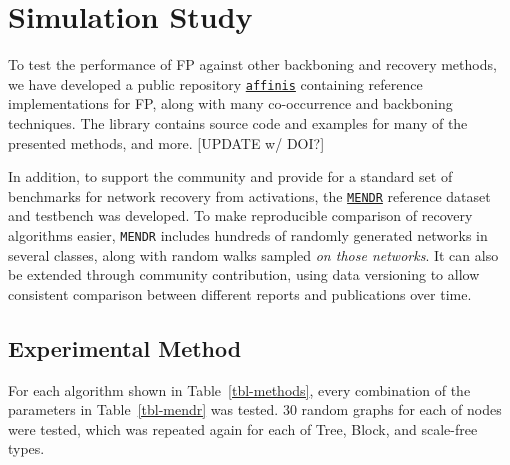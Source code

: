 \documentclass[%
	12pt,
		oneside,
		letterpaper
]{book}
\begin{document}
\section{Simulation Study}\label{sec-FP-experiments}

To test the performance of FP against other backboning and recovery
methods, we have developed a public repository
\href{https://github.com/rtbs-dev/affinis}{\texttt{affinis}} containing
reference implementations for FP, along with many co-occurrence and
backboning techniques. The library contains source code and examples for
many of the presented methods, and more. {[}UPDATE w/ DOI?{]}

In addition, to support the community and provide for a standard set of
benchmarks for network recovery from activations, the
\href{https://github.com/rtbs-dev/mendr}{\texttt{MENDR}} reference
dataset and testbench was developed. To make reproducible comparison of
recovery algorithms easier, \texttt{MENDR} includes hundreds of randomly
generated networks in several classes, along with random walks sampled
\emph{on those networks}. It can also be extended through community
contribution, using data versioning to allow consistent comparison
between different reports and publications over time.

\subsection{Experimental Method}\label{experimental-method}

For each algorithm shown in Table~\ref{tbl-methods}, every combination
of the parameters in Table~\ref{tbl-mendr} was tested. 30 random graphs
for each of nodes were tested, which was repeated again for each of
Tree, Block, and scale-free types.
\end{document}
